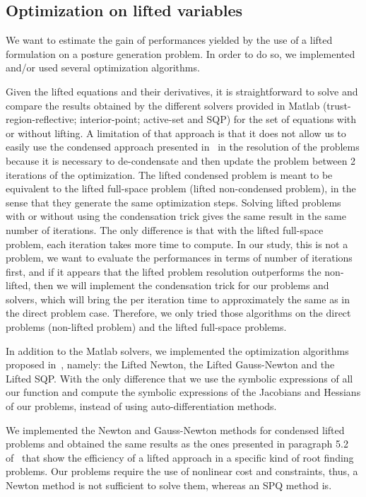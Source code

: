 \subsection{Optimization on lifted variables}
\label{subsec:optimization_on_lifted_variables}

We want to estimate the gain of performances yielded by the use of a lifted formulation on a posture generation problem.
In order to do so, we implemented and/or used several optimization algorithms.

Given the lifted equations and their derivatives, it is straightforward to solve and compare the results obtained by the different solvers provided in Matlab (trust-region-reflective; interior-point; active-set and SQP) for the set of equations with or without lifting.
A limitation of that approach is that it does not allow us to easily use the condensed approach presented in~\cite{Albersmeyer:2010:LNM:1958447.1958472} in the resolution of the problems because it is necessary to de-condensate and then update the problem between 2 iterations of the optimization.
The lifted condensed problem is meant to be equivalent to the lifted full-space problem (lifted non-condensed problem), in the sense that they generate the same optimization steps.
Solving lifted problems with or without using the condensation trick gives the same result in the same number of iterations.
The only difference is that with the lifted full-space problem, each iteration takes more time to compute.
In our study, this is not a problem, we want to evaluate the performances in terms of number of iterations first, and if it appears that the lifted problem resolution outperforms the non-lifted, then we will implement the condensation trick for our problems and solvers, which will bring the per iteration time to approximately the same as in the direct problem case.
Therefore, we only tried those algorithms on the direct problems (non-lifted problem) and the lifted full-space problems.

In addition to the Matlab solvers, we implemented the optimization algorithms proposed in~\cite{Albersmeyer:2010:LNM:1958447.1958472}, namely: the Lifted Newton, the Lifted Gauss-Newton and the Lifted SQP\@.
With the only difference that we use the symbolic expressions of all our function and compute the symbolic expressions of the Jacobians and Hessians of our problems, instead of using auto-differentiation methods.

We implemented the Newton and Gauss-Newton methods for condensed lifted problems and obtained the same results as the ones presented in paragraph 5.2 of~\cite{Albersmeyer:2010:LNM:1958447.1958472} that show the efficiency of a lifted approach in a specific kind of root finding problems.
Our problems require the use of nonlinear cost and constraints, thus, a Newton method is not sufficient to solve them, whereas an SPQ method is.

